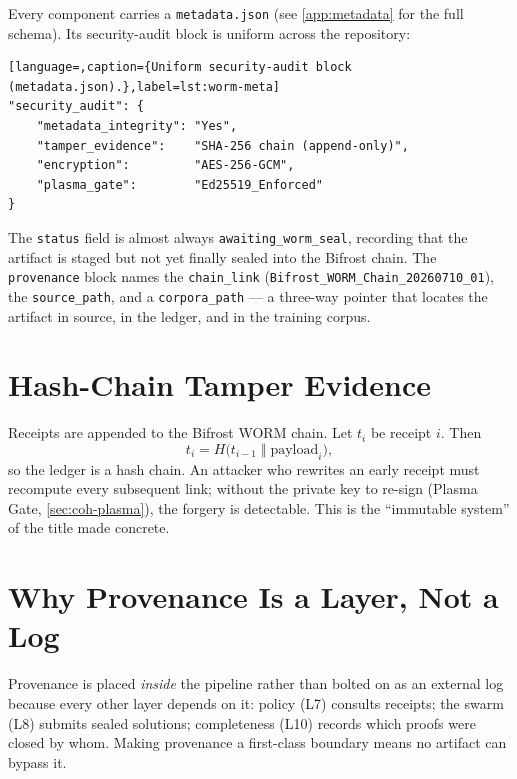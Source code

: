 Every component carries a \texttt{metadata.json} (see \cref{app:metadata} for
the full schema). Its security-audit block is uniform across the repository:
\begin{lstlisting}[language=,caption={Uniform security-audit block (metadata.json).},label=lst:worm-meta]
"security_audit": {
    "metadata_integrity": "Yes",
    "tamper_evidence":    "SHA-256 chain (append-only)",
    "encryption":         "AES-256-GCM",
    "plasma_gate":        "Ed25519_Enforced"
}
\end{lstlisting}
The \texttt{status} field is almost always \texttt{awaiting\_worm\_seal},
recording that the artifact is staged but not yet finally sealed into the
Bifrost chain. The \texttt{provenance} block names the
\texttt{chain\_link} (\texttt{Bifrost\_WORM\_Chain\_20260710\_01}), the
\texttt{source\_path}, and a \texttt{corpora\_path} --- a three-way pointer
that locates the artifact in source, in the ledger, and in the training
corpus.

\section{Hash-Chain Tamper Evidence}
\label{sec:worm-chain}

Receipts are appended to the Bifrost WORM chain. Let $t_i$ be receipt $i$.
Then
\begin{equation}
t_i = H\bigl(t_{i-1} \;\Vert\; \text{payload}_i\bigr),
\end{equation}
so the ledger is a hash chain. An attacker who rewrites an early receipt must
recompute every subsequent link; without the private key to re-sign (Plasma
Gate, \cref{sec:coh-plasma}), the forgery is detectable. This is the
``immutable system'' of the title made concrete.

\section{Why Provenance Is a Layer, Not a Log}
\label{sec:worm-why}

Provenance is placed \emph{inside} the pipeline rather than bolted on as an
external log because every other layer depends on it: policy (L7) consults
receipts; the swarm (L8) submits sealed solutions; completeness (L10) records
which proofs were closed by whom. Making provenance a first-class boundary
means no artifact can bypass it.
